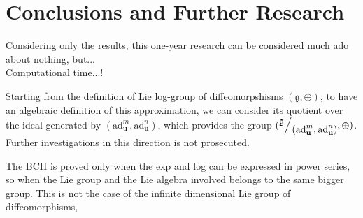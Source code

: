 \section{Conclusions and Further Research}\label{ch:conclusions}


Considering only the results, this one-year research can be considered much ado about nothing, but...\\
Computational time...!

Starting from the definition of Lie log-group of diffeomorpshisms $(\mathfrak{g} , \oplus)$, to have an algebraic definition of this approximation, we can consider its quotient over the ideal generated by $(\text{ad}_{\mathbf{u}}^{m}, \text{ad}_{\mathbf{u}}^{n})$, which provides the group $(\quotient{\mathfrak{g}}{(\text{ad}_{\mathbf{u}}^{m}, \text{ad}_{\mathbf{u}}^{n})}, \oplus)$. Further investigations in this direction is not prosecuted.


The BCH is proved only when the exp and log can be expressed in power series, so when the Lie group and the Lie algebra involved belongs to the same bigger group. This is not the case of the infinite dimensional Lie group of diffeomorphisms,